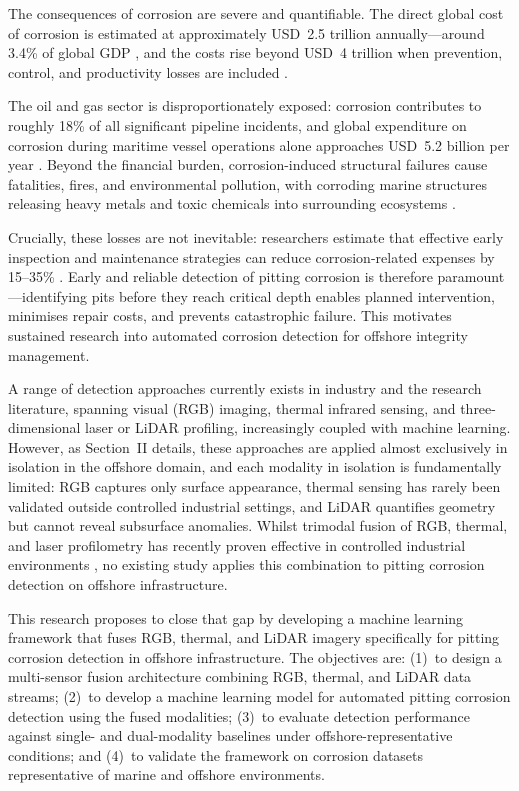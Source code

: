 The consequences of corrosion are severe and quantifiable. The direct global cost of corrosion is estimated at approximately USD~2.5 trillion annually—around 3.4\% of global GDP \cite{kahkesh2025algae, imran2025ship}, and the costs rise beyond USD~4 trillion when prevention, control, and productivity losses are included \cite{bakdash2026analytical}.

The oil and gas sector is disproportionately exposed: corrosion contributes to roughly 18\% of all significant pipeline incidents, and global expenditure on corrosion during maritime vessel operations alone approaches USD~5.2 billion per year \cite{olawole2026advanced}. Beyond the financial burden, corrosion-induced structural failures cause fatalities, fires, and environmental pollution, with corroding marine structures releasing heavy metals and toxic chemicals into surrounding ecosystems \cite{dalmora2025methods}.

Crucially, these losses are not inevitable: researchers estimate that effective early inspection and maintenance strategies can reduce corrosion-related expenses by 15--35\% \cite{olawole2026advanced}. Early and reliable detection of pitting corrosion is therefore paramount—identifying pits before they reach critical depth enables planned intervention, minimises repair costs, and prevents catastrophic failure. This motivates sustained research into automated corrosion detection for offshore integrity management.

A range of detection approaches currently exists in industry and the research literature, spanning visual (RGB) imaging, thermal infrared sensing, and three-dimensional laser or LiDAR profiling, increasingly coupled with machine learning. However, as Section~II details, these approaches are applied almost exclusively in isolation in the offshore domain, and each modality in isolation is fundamentally limited: RGB captures only surface appearance, thermal sensing has rarely been validated outside controlled industrial settings, and LiDAR quantifies geometry but cannot reveal subsurface anomalies. Whilst trimodal fusion of RGB, thermal, and laser profilometry has recently proven effective in controlled industrial environments \cite{zhang2026application}, no existing study applies this combination to pitting corrosion detection on offshore infrastructure.

This research proposes to close that gap by developing a machine learning framework that fuses RGB, thermal, and LiDAR imagery specifically for pitting corrosion detection in offshore infrastructure. The objectives are: (1)~to design a multi-sensor fusion architecture combining RGB, thermal, and LiDAR data streams; (2)~to develop a machine learning model for automated pitting corrosion detection using the fused modalities; (3)~to evaluate detection performance against single- and dual-modality baselines under offshore-representative conditions; and (4)~to validate the framework on corrosion datasets representative of marine and offshore environments.


